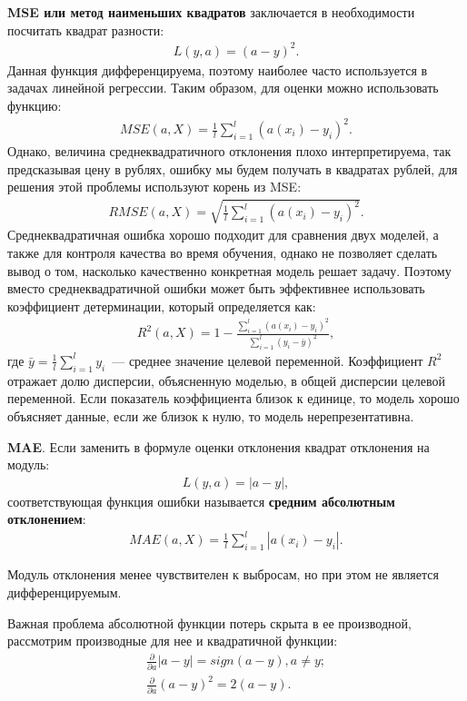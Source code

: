 \documentclass[12pt,a4paper]{article} %
\begin{document}
\textbf{MSE или метод наименьших квадратов} заключается в необходимости посчитать квадрат разности:
\begin{gather}\label{linregdiff1}
	L(y,a) = {(a-y)}^2.
\end{gather}
Данная функция дифференцируема, поэтому наиболее часто используется в задачах линейной регрессии. Таким образом, для оценки можно использовать функцию:
\begin{gather}\label{linregdiff2}
	MSE(a, X) = \frac{1}{l}\sum\limits_{i=1}^{l}{(a(x_i)-y_i)}^2.
\end{gather}
Однако, величина среднеквадратичного отклонения плохо интерпретируема, так предсказывая цену в рублях, ошибку мы будем получать в квадратах рублей, для решения этой проблемы используют корень из MSE:
\begin{gather}\label{linregdiff22}
	RMSE(a, X) =
	\sqrt{ \frac{1}{l}\sum\limits_{i=1}^{l}{(a(x_i)-y_i)}^2}.
\end{gather}
Среднеквадратичная ошибка хорошо подходит для сравнения двух моделей, а также для контроля качества во время обучения, однако не позволяет сделать вывод о том, насколько качественно конкретная модель решает задачу. Поэтому вместо среднеквадратичной ошибки может быть эффективнее использовать коэффициент детерминации, который определяется как:
\begin{gather}\label{linregdiff3}
	R^2(a, X) = 1 - \frac{\sum_{i=1}^{l}{(a(x_i)-y_i)}^2}{\sum_{i=1}^{l}{(y_i-\bar{y})}^2},
\end{gather}
где $\bar{y} = \frac{1}{l}\sum_{i=1}^{l}y_i$~--- среднее значение целевой переменной. Коэффициент $R^2$ отражает долю дисперсии, объясненную моделью, в общей дисперсии целевой переменной. Если показатель коэффициента близок к единице, то модель хорошо объясняет данные, если же близок к нулю, то модель нерепрезентативна.

\textbf{MAE}. Если заменить в формуле оценки отклонения квадрат отклонения на модуль:
\begin{gather}\label{linregdiff4}
	L(y,a) = |a-y|,
\end{gather}
соответствующая функция ошибки  называется \textbf{средним абсолютным отклонением}:
\begin{gather}\label{linregdiff5}
	MAE(a,X) = \frac{1}{l}\sum\limits_{i=1}^{l}|a(x_i)-y_i|.
\end{gather}

Модуль отклонения менее чувствителен к выбросам, но при этом не является дифференцируемым.

Важная проблема абсолютной функции потерь скрыта в ее производной, рассмотрим производные для нее и квадратичной функции:
\begin{gather}\label{linregdiff6}
	\frac{\partial}{\partial a}|a-y| = sign(a-y), a\not=y;\\
	\frac{\partial}{\partial a}(a-y)^2 = 2(a-y).
\end{gather}
 
\end{document}
